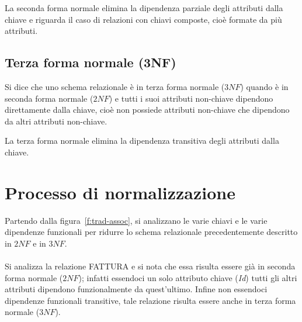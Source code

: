 	La seconda forma normale elimina la dipendenza parziale degli attributi dalla chiave e riguarda il caso di relazioni con chiavi composte, cioè formate da più attributi.
	
	\subsection{Terza forma normale (3NF)}
	Si dice che uno schema relazionale è in terza forma normale ($3NF$) quando è in seconda forma normale ($2NF$) e tutti i suoi attributi non-chiave dipendono direttamente dalla chiave, cioè non possiede attributi non-chiave che dipendono da altri attributi non-chiave.
	
	La terza forma normale elimina la dipendenza transitiva degli attributi dalla chiave.
	
\section{Processo di normalizzazione}
Partendo dalla figura~\vref{f:trad-assoc}, si analizzano le varie chiavi e le varie dipendenze funzionali per ridurre lo schema relazionale precedentemente descritto in $2NF$ e in $3NF$.\\
\\
Si analizza la relazione FATTURA e si nota che essa risulta essere già in seconda forma normale ($2NF$);
infatti essendoci un solo attributo chiave (\emph{Id}) tutti gli altri attributi dipendono funzionalmente da quest'ultimo.
Infine non essendoci dipendenze funzionali transitive, tale relazione risulta essere anche in terza forma normale ($3NF$).

